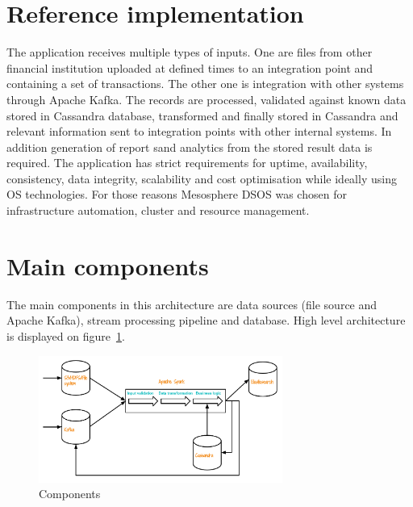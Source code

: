 \documentclass[a4paper, 10 pt, conference]{IEEEtran}
\begin{document}
\section{Reference implementation}

The application receives multiple types of inputs. One are files from other financial institution uploaded at defined times to an integration point and containing a set of transactions. The other one is integration with other systems through Apache Kafka. The records are processed, validated against known data stored in Cassandra database, transformed and finally stored in Cassandra and relevant information sent to integration points with other internal systems. In addition generation of report sand analytics from the stored result data is required. The application has strict requirements for uptime, availability, consistency, data integrity, scalability and cost optimisation while ideally using OS technologies. For those reasons Mesosphere DSOS was chosen for infrastructure automation, cluster and resource management.

\section{Main components}

The main components in this architecture are data sources (file source and Apache Kafka), stream processing pipeline and database. High level architecture is displayed on figure~\ref{fig:components}. 

\begin{figure}[hb]
	\begin{center}
		\caption{Components}
		\label{fig:components}
		\includegraphics[width=8cm,keepaspectratio]{architecture-diagram.png}
	\end{center}
\end{figure}
\end{document}

